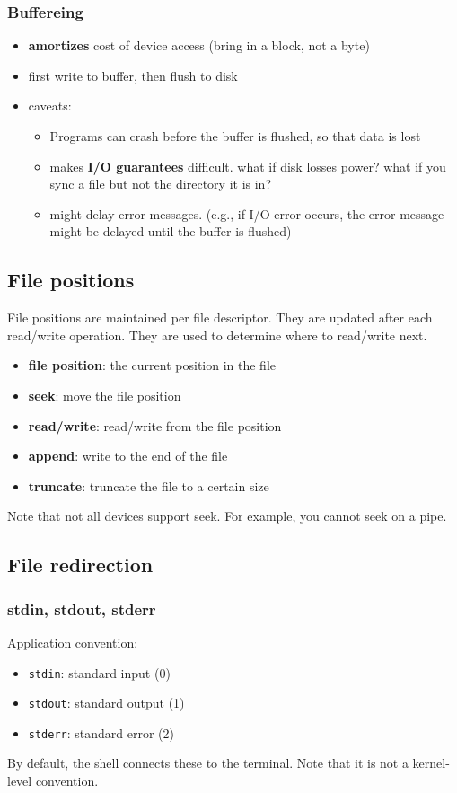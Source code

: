 \documentclass[letterpaper,12pt]{article}
\begin{document}
\subsubsection{Buffereing}
\begin{itemize}
    \item \textbf{amortizes} cost of device access (bring in a block, not a byte)
    \item first write to buffer, then flush to disk
    \item caveats: \begin{itemize}
        \item Programs can crash before the buffer is flushed, so that data is lost
        \item makes \textbf{I/O guarantees} difficult. what if disk losses power? what if you sync a file but not the directory it is in?
        \item might delay error messages. (e.g., if I/O error occurs, the error message might be delayed until the buffer is flushed)
    \end{itemize}
\end{itemize}
\subsection{File positions}
File positions are maintained per file descriptor. They are updated after each read/write operation. They are used to determine where to read/write next.
\begin{itemize}
    \item \textbf{file position}: the current position in the file
    \item \textbf{seek}: move the file position
    \item \textbf{read/write}: read/write from the file position
    \item \textbf{append}: write to the end of the file
    \item \textbf{truncate}: truncate the file to a certain size
\end{itemize}
Note that not all devices support seek. For example, you cannot seek on a pipe.
\subsection{File redirection}
\subsubsection{stdin, stdout, stderr}
Application convention: \begin{itemize}
    \item \texttt{stdin}: standard input (0)
    \item \texttt{stdout}: standard output (1)
    \item \texttt{stderr}: standard error (2)
\end{itemize}
By default, the shell connects these to the terminal. Note that it is not a kernel-level convention.
\end{document}
